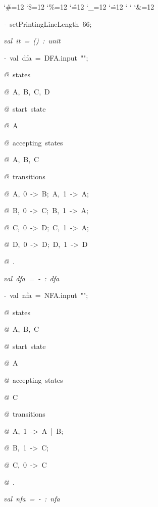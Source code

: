 \begin{list}{}
{\setlength{\leftmargin}{\leftmargini}
\setlength{\rightmargin}{0cm}
\setlength{\itemindent}{0cm}
\setlength{\listparindent}{0cm}
\setlength{\itemsep}{0cm}
\setlength{\parsep}{0cm}
\setlength{\labelsep}{0cm}
\setlength{\labelwidth}{0cm}
\catcode`\#=12
\catcode`\$=12
\catcode`\%=12
\catcode`\^=12
\catcode`\_=12
\catcode`\.=12
\catcode`
\catcode`
\catcode`\&=12
\ttfamily}
\small
\item[]\textsl{-\ }setPrintingLineLength\ 66;
\item[]\textsl{val\ it\ =\ ()\ :\ unit}
\item[]\textsl{-\ }val\ dfa\ =\ DFA.input\ "";
\item[]\textsl{@\ }states
\item[]\textsl{@\ }A,\ B,\ C,\ D
\item[]\textsl{@\ }start\ state
\item[]\textsl{@\ }A
\item[]\textsl{@\ }accepting\ states
\item[]\textsl{@\ }A,\ B,\ C
\item[]\textsl{@\ }transitions
\item[]\textsl{@\ }A,\ 0\ ->\ B;\ A,\ 1\ ->\ A;
\item[]\textsl{@\ }B,\ 0\ ->\ C;\ B,\ 1\ ->\ A;
\item[]\textsl{@\ }C,\ 0\ ->\ D;\ C,\ 1\ ->\ A;
\item[]\textsl{@\ }D,\ 0\ ->\ D;\ D,\ 1\ ->\ D
\item[]\textsl{@\ }.
\item[]\textsl{val\ dfa\ =\ -\ :\ dfa}
\item[]\textsl{-\ }val\ nfa\ =\ NFA.input\ "";
\item[]\textsl{@\ }states
\item[]\textsl{@\ }A,\ B,\ C
\item[]\textsl{@\ }start\ state
\item[]\textsl{@\ }A
\item[]\textsl{@\ }accepting\ states
\item[]\textsl{@\ }C
\item[]\textsl{@\ }transitions
\item[]\textsl{@\ }A,\ 1\ ->\ A\ |\ B;
\item[]\textsl{@\ }B,\ 1\ ->\ C;
\item[]\textsl{@\ }C,\ 0\ ->\ C
\item[]\textsl{@\ }.
\item[]\textsl{val\ nfa\ =\ -\ :\ nfa}
\end{list}
